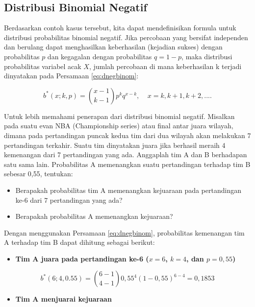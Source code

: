 \documentclass[]{book}
\providecommand{\tightlist}{%
  \setlength{\itemsep}{0pt}\setlength{\parskip}{0pt}}
\begin{document}
\subsection{Distribusi Binomial
Negatif}\label{distribusi-binomial-negatif}

Berdasarkan contoh kasus tersebut, kita dapat mendefinisikan formula
untuk distribusi probabilitas binomial negatif. Jika percobaan yang
bersifat independen dan berulang dapat menghasilkan keberhasilan
(kejadian sukses) dengan probabilitas \(p\) dan kegagalan dengan
probabilitas \(q=1-p\), maka distribusi probabilitas variabel acak
\(X\), jumlah percobaan di mana keberhasilan k terjadi dinyatakan pada
Persamaan \eqref{eq:dnegbinom}:

\begin{equation}
   b^{\ast}\left(x;k,p\right)=\binom{x-1}{k-1}p^kq^{x-k},\ \ \ \ \ x=k,k+1,k+2,....
  \label{eq:dnegbinom}
\end{equation}

Untuk lebih memahami penerapan dari distribusi binomial negatif.
Misalkan pada suatu evan NBA (Championship series) atau final antar
juara wilayah, dimana pada pertandingan puncak kedua tim dari dua
wilayah akan melakukan 7 pertandingan terkahir. Suatu tim dinyatakan
juara jika berhasil meraih 4 kemenangan dari 7 pertandingan yang ada.
Anggaplah tim A dan B berhadapan satu sama lain. Probabilitas A
memenangkan suatu pertandingan terhadap tim B sebesar 0,55, tentukan:

\begin{itemize}
\tightlist
\item
  Berapakah probabilitas tim A memenangkan kejuaraan pada pertandingan
  ke-6 dari 7 pertandingan yang ada?
\item
  Berapakah probabilitas A memenangkan kejuaraan?
\end{itemize}

Dengan menggunakan Persamaan \eqref{eq:dnegbinom}, probabilitas kemenangan
tim A terhadap tim B dapat dihitung sebagai berikut:

\begin{itemize}
\tightlist
\item
  \textbf{Tim A juara pada pertandingan ke-6 (\(x=6\), \(k=4\), dan
  \(p=0,55\))}
\end{itemize}

\[
b^{\ast}\left(6;4,0.55\right)=\binom{6-1}{4-1}0,55^4\left(1-0,55\right)^{6-4}=0,1853
\]

\begin{itemize}
\tightlist
\item
  \textbf{Tim A menjuarai kejuaraan}
\end{itemize}
\end{document}

